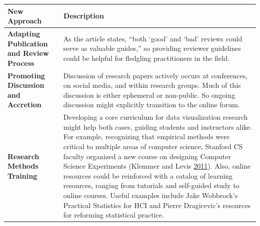 \documentclass[]{book}
\begin{document}
\begin{longtable}[]{@{}ll@{}}
\toprule
\begin{minipage}[b]{0.25\columnwidth}\raggedright
\textbf{New Approach}\strut
\end{minipage} & \begin{minipage}[b]{0.69\columnwidth}\raggedright
\textbf{Description}\strut
\end{minipage}\tabularnewline
\midrule
\endhead
\begin{minipage}[t]{0.25\columnwidth}\raggedright
\textbf{Adapting Publication and Review Process}\strut
\end{minipage} & \begin{minipage}[t]{0.69\columnwidth}\raggedright
As the article states, ``both `good' and `bad' reviews could serve as valuable guides,'' so providing reviewer guidelines could be helpful for fledgling practitioners in the field.\strut
\end{minipage}\tabularnewline
\begin{minipage}[t]{0.25\columnwidth}\raggedright
\textbf{Promoting Discussion and Accretion}\strut
\end{minipage} & \begin{minipage}[t]{0.69\columnwidth}\raggedright
Discussion of research papers actively occurs at conferences, on social media, and within research groups. Much of this discussion is either ephemeral or non-public. So ongoing discussion might explicitly transition to the online forum.\strut
\end{minipage}\tabularnewline
\begin{minipage}[t]{0.25\columnwidth}\raggedright
\textbf{Research Methods Training}\strut
\end{minipage} & \begin{minipage}[t]{0.69\columnwidth}\raggedright
Developing a core curriculum for data visualization research might help both cases, guiding students and instructors alike. For example, recognizing that empirical methods were critical to multiple areas of computer science, Stanford CS faculty organized a new course on designing Computer Science Experiments (Klemmer and Levis \protect\hyperlink{ref-stanford_course}{2011}). Also, online resources could be reinforced with a catalog of learning resources, ranging from tutorials and self-guided study to online courses. Useful examples include Jake Wobbrock's Practical Statistics for HCI and Pierre Dragicevic's resources for reforming statistical practice.\strut
\end{minipage}\tabularnewline
\bottomrule
\end{longtable}
\end{document}
